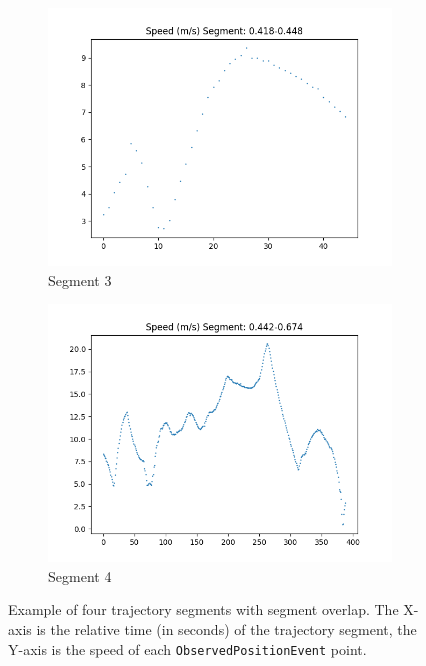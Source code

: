 \begin{figure}
\begin{subfigure}[b]{0.475\textwidth}
        \centering 
        \includegraphics[width=\textwidth]{figures/segment_11}
        \caption[]%
        {{\small Segment 3}}    
        \label{fig:segment-3}
    \end{subfigure}
    \quad
    \begin{subfigure}[b]{0.475\textwidth}   
        \centering 
        \includegraphics[width=\textwidth]{figures/segment_12}
        \caption[]%
        {{\small Segment 4}}    
        \label{fig:segment-4}
    \end{subfigure}
    \caption[ Example of trajectory segments ]
    {{\small Example of four trajectory segments with segment overlap.
    The X-axis is the relative time (in seconds) of the trajectory segment, the Y-axis is the speed of each \texttt{ObservedPositionEvent} point.}} 
    \label{fig:segments}
\end{figure}

